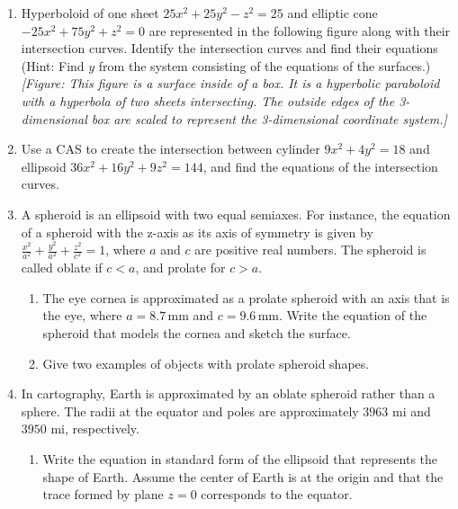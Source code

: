 \documentclass{exercises}
\begin{document}
\begin{enumerate}[resume]
\begin{enumerate}[label=(\alph*)]
  \item Solve the system consisting of the equations of the surfaces to find the equations of the intersection curve. (Hint: Find $x$ and $y$ in terms of $z$.)
  \item Use a computer algebra system (CAS) to visualize the intersection curve on sphere $x^{2}+y^{2}+z^{2}=4$.
\end{enumerate}
\item Hyperboloid of one sheet $25x^{2}+25y^{2}-z^{2}=25$ and elliptic cone $-25x^{2}+75y^{2}+z^{2}=0$ are represented in the following figure along with their intersection curves. Identify the intersection curves and find their equations (Hint: Find $y$ from the system consisting of the equations of the surfaces.) \\ \textit{[Figure: This figure is a surface inside of a box. It is a hyperbolic paraboloid with a hyperbola of two sheets intersecting. The outside edges of the 3-dimensional box are scaled to represent the 3-dimensional coordinate system.]}
\item \techrequired Use a CAS to create the intersection between cylinder $9x^{2}+4y^{2}=18$ and ellipsoid $36x^{2}+16y^{2}+9z^{2}=144$, and find the equations of the intersection curves.
\item \techrequired A spheroid is an ellipsoid with two equal semiaxes. For instance, the equation of a spheroid with the z-axis as its axis of symmetry is given by $\frac{x^{2}}{a^{2}}+\frac{y^{2}}{a^{2}}+\frac{z^{2}}{c^{2}}=1$, where $a$ and $c$ are positive real numbers. The spheroid is called oblate if $c<a$, and prolate for $c>a$.
\begin{enumerate}[label=(\alph*)]
  \item The eye cornea is approximated as a prolate spheroid with an axis that is the eye, where $a=8.7\,\text{mm}$ and $c=9.6\,\text{mm}$. Write the equation of the spheroid that models the cornea and sketch the surface.
  \item Give two examples of objects with prolate spheroid shapes.
\end{enumerate}
\item \techrequired In cartography, Earth is approximated by an oblate spheroid rather than a sphere. The radii at the equator and poles are approximately $3963$ mi and $3950$ mi, respectively.
\begin{enumerate}[label=(\alph*)]
  \item Write the equation in standard form of the ellipsoid that represents the shape of Earth. Assume the center of Earth is at the origin and that the trace formed by plane $z=0$ corresponds to the equator.

\end{enumerate}
\end{enumerate}
\end{document}
